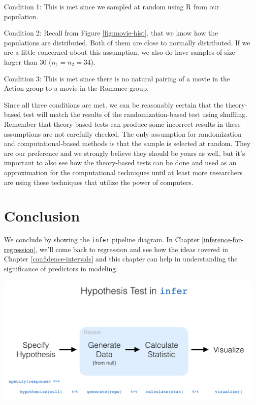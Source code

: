 \documentclass[12pt,]{krantz}
\begin{document}
Condition 1: This is met since we sampled at random using R from our
population.

Condition 2: Recall from Figure \ref{fig:movie-hist}, that we know how
the populations are distributed. Both of them are close to normally
distributed. If we are a little concerned about this assumption, we also
do have samples of size larger than 30 (\(n_1 = n_2 = 34\)).

Condition 3: This is met since there is no natural pairing of a movie in
the Action group to a movie in the Romance group.

Since all three conditions are met, we can be reasonably certain that
the theory-based test will match the results of the randomization-based
test using shuffling. Remember that theory-based tests can produce some
incorrect results in these assumptions are not carefully checked. The
only assumption for randomization and computational-based methods is
that the sample is selected at random. They are our preference and we
strongly believe they should be yours as well, but it's important to
also see how the theory-based tests can be done and used as an
approximation for the computational techniques until at least more
researchers are using these techniques that utilize the power of
computers.

\section{Conclusion}\label{conclusion-8}

We conclude by showing the \texttt{infer} pipeline diagram. In Chapter
\ref{inference-for-regression}, we'll come back to regression and see
how the ideas covered in Chapter \ref{confidence-intervals} and this
chapter can help in understanding the significance of predictors in
modeling.

\begin{center}\includegraphics[width=\textwidth]{images/flowcharts/infer/ht_diagram} \end{center}
\end{document}
